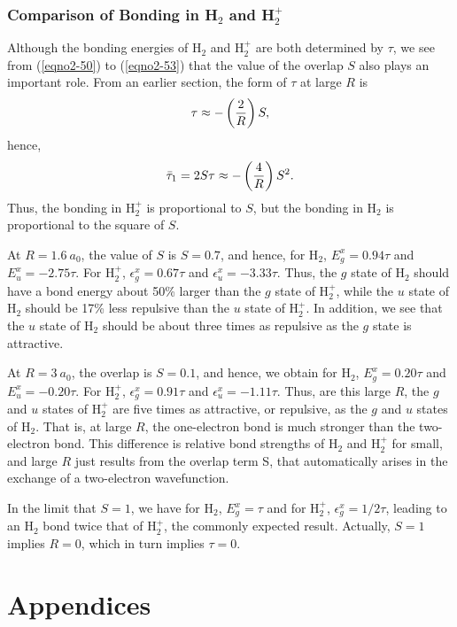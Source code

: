 \subsubsection{Comparison of Bonding in H$_2$ and H$^+_2$}

Although the bonding energies of H$_2$ and H$^+_2$ are both determined
by $\tau$, we see from (\ref{eqno2-50}) to (\ref{eqno2-53}) that the
value of the overlap $S$ also plays an important role. From an earlier
section, the form of $\tau$ at large $R$ is
\begin{equation}
\tau \approx - \left( {2 \over R} \right) S,
\end{equation}
hence,
\begin{equation}
{\bar{\tau}}_1 = 2 S \tau \approx - \left( {4 \over R} \right) S^2.
\end{equation}
Thus, the bonding in H$^+_2$ is proportional to $S$, but the bonding in 
H$_2$ is proportional to the square of $S$.
    
At $R = 1.6\ a_0$, the value of $S$ is $S = 0.7$, and hence, for H$_2$, 
$E^x_g  = 0.94 \tau$ and $E^x_u = - 2.75 \tau$.  For H$^+_2$, 
$\epsilon^x_g = 0.67 \tau$ and $\epsilon^x_u = - 3.33 \tau$.  Thus, the $g$ 
state of H$_2$ should have a bond energy about 50\% larger than the 
$g$ state of H$^+_2$, while the $u$ state of H$_2$ should be 17\% less 
repulsive than the $u$ state of H$^+_2$.  In addition, we see that 
the $u$ state of H$_2$ should be about three times as
repulsive as the $g$ state is attractive.

At $R = 3\ a_0$, the overlap is $S = 0.1$, and hence, we obtain for 
H$_2$, $E^x_g = 0.20 \tau$ and $E^x_u = - 0.20 \tau$.  For H$^+_2$, 
$\epsilon^x_g = 0.91 \tau$ and $\epsilon^x_u = - 1.11 \tau$. Thus,
are this large $R$, the $g$ and $u$ states of H$^+_2$ are five times 
as attractive, or repulsive, as the $g$ and $u$ states of H$_2$. That 
is, at large $R$, the one-electron bond is much stronger than the 
two-electron bond. This difference is relative bond strengths of H$_2$ 
and H$^+_2$ for small, and large $R$ just results from the
overlap term S, that automatically arises in the exchange of a two-electron
wavefunction.
    
In the limit that $S = 1$, we have for H$_2$, $E^x_g = \tau$ and for 
H$^+_2$, $\epsilon^x_g = 1/2 \tau$, leading to an H$_2$ bond twice that 
of H$^+_2$, the commonly expected result.  Actually, $S = 1$ implies 
$R = 0$, which in turn implies $\tau = 0$.

\section{Appendices}
